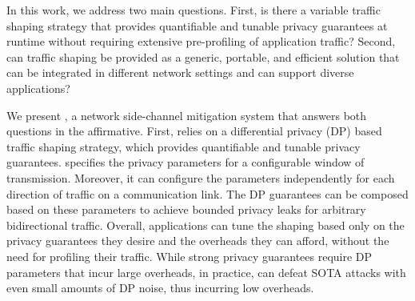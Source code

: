 In this work, we address two main questions. First, is there a variable traffic
shaping strategy that provides quantifiable and tunable privacy guarantees at
runtime without requiring extensive pre-profiling of application traffic?
Second, can traffic shaping be provided as a generic, portable, and efficient
solution that can be integrated in different network settings and can support
diverse applications?

We present {\sys}, a network side-channel mitigation system that answers both
questions in the affirmative.
First, {\sys} relies on a differential privacy (DP) based traffic shaping
strategy, which provides quantifiable and tunable privacy guarantees.
{\sys} specifies the privacy parameters for a configurable window of
transmission. Moreover, it can configure the parameters independently for each
direction of traffic on a communication link. The DP guarantees can be composed
based on these parameters to achieve bounded privacy leaks for arbitrary
bidirectional traffic.
Overall, applications can tune the shaping based only on the privacy guarantees
they desire and the overheads they can afford, without the need for
profiling their traffic.
While strong privacy guarantees require DP parameters that incur
large overheads, in practice, {\sys} can defeat SOTA attacks with even small
amounts of DP noise, thus incurring low overheads.

